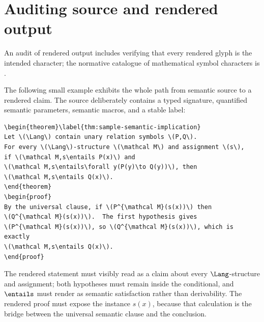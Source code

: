 \section{Auditing source and rendered output}
\label{sec:latex-style-source-render}

An audit of rendered output includes verifying that every rendered glyph is
the intended character; the normative catalogue of mathematical symbol
characters is \cite{Unicode2025}.

The following small example exhibits the whole path from semantic source to a
rendered claim.  The source deliberately contains a typed signature, quantified
semantic parameters, semantic macros, and a stable label:
\begin{lstlisting}[language={[LaTeX]TeX},caption={Source for a semantic implication}]
\begin{theorem}\label{thm:sample-semantic-implication}
Let \(\Lang\) contain unary relation symbols \(P,Q\).
For every \(\Lang\)-structure \(\mathcal M\) and assignment \(s\),
if \(\mathcal M,s\entails P(x)\) and
\(\mathcal M,s\entails\forall y(P(y)\to Q(y))\), then
\(\mathcal M,s\entails Q(x)\).
\end{theorem}
\begin{proof}
By the universal clause, if \(P^{\mathcal M}(s(x))\) then
\(Q^{\mathcal M}(s(x))\).  The first hypothesis gives
\(P^{\mathcal M}(s(x))\), so \(Q^{\mathcal M}(s(x))\), which is exactly
\(\mathcal M,s\entails Q(x)\).
\end{proof}
\end{lstlisting}

The rendered statement must visibly read as a claim about every
\(\Lang\)-structure and assignment; both hypotheses must remain inside the
conditional, and \(\entails\) must render as semantic satisfaction rather than
derivability.  The rendered proof must expose the instance \(s(x)\), because
that calculation is the bridge between the universal semantic clause and the
conclusion.

